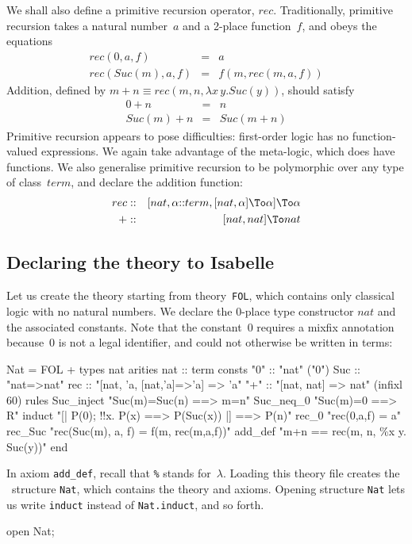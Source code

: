 \noindent
We shall also define a primitive recursion operator, $rec$.  Traditionally,
primitive recursion takes a natural number~$a$ and a 2-place function~$f$,
and obeys the equations
\begin{eqnarray*}
  rec(0,a,f)            & = & a \\
  rec(Suc(m),a,f)       & = & f(m, rec(m,a,f))
\end{eqnarray*}
Addition, defined by $m+n \equiv rec(m,n,\lambda x\,y.Suc(y))$,
should satisfy
\begin{eqnarray*}
  0+n      & = & n \\
  Suc(m)+n & = & Suc(m+n)
\end{eqnarray*}
Primitive recursion appears to pose difficulties: first-order logic has no
function-valued expressions.  We again take advantage of the meta-logic,
which does have functions.  We also generalise primitive recursion to be
polymorphic over any type of class~$term$, and declare the addition
function:
\begin{eqnarray*}
  rec   & :: & [nat, \alpha{::}term, [nat,\alpha]\To\alpha] \To\alpha \\
  +     & :: & [nat,nat]\To nat 
\end{eqnarray*}


\subsection{Declaring the theory to Isabelle}
Let us create the theory  starting from theory~\verb$FOL$,
which contains only classical logic with no natural numbers.  We declare
the 0-place type constructor $nat$ and the associated constants.  Note that
the constant~0 requires a mixfix annotation because~0 is not a legal
identifier, and could not otherwise be written in terms:
\begin{ttbox}
Nat = FOL +
types   nat
arities nat         :: term
consts  "0"         :: "nat"                              ("0")
        Suc         :: "nat=>nat"
        rec         :: "[nat, 'a, [nat,'a]=>'a] => 'a"
        "+"         :: "[nat, nat] => nat"                (infixl 60)
rules   Suc_inject  "Suc(m)=Suc(n) ==> m=n"
        Suc_neq_0   "Suc(m)=0      ==> R"
        induct      "[| P(0);  !!x. P(x) ==> P(Suc(x)) |]  ==> P(n)"
        rec_0       "rec(0,a,f) = a"
        rec_Suc     "rec(Suc(m), a, f) = f(m, rec(m,a,f))"
        add_def     "m+n == rec(m, n, \%x y. Suc(y))"
end
\end{ttbox}
In axiom {\tt add_def}, recall that \verb|%| stands for~$\lambda$.
Loading this theory file creates the \ML\ structure {\tt Nat}, which
contains the theory and axioms.  Opening structure {\tt Nat} lets us write
{\tt induct} instead of {\tt Nat.induct}, and so forth.
\begin{ttbox}
open Nat;
\end{ttbox}

